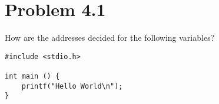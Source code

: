 \documentclass[titlepage]{article}
\begin{document}

\section*{Problem 4.1}
How are the addresses decided for the following variables?

\begin{lstlisting}
#include <stdio.h>

int main () {
    printf("Hello World\n");
}
\end{lstlisting}
\end{document}
